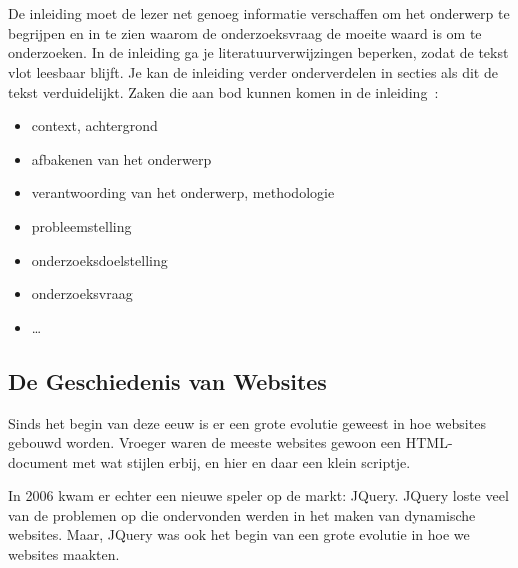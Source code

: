 
\chapter{}
\label{ch:inleiding}

De inleiding moet de lezer net genoeg informatie verschaffen om het onderwerp te begrijpen en in te zien waarom de onderzoeksvraag de moeite waard is om te onderzoeken. In de inleiding ga je literatuurverwijzingen beperken, zodat de tekst vlot leesbaar blijft. Je kan de inleiding verder onderverdelen in secties als dit de tekst verduidelijkt. Zaken die aan bod kunnen komen in de inleiding~\autocite{Pollefliet2011}:

\begin{itemize}
  \item context, achtergrond
  \item afbakenen van het onderwerp
  \item verantwoording van het onderwerp, methodologie
  \item probleemstelling
  \item onderzoeksdoelstelling
  \item onderzoeksvraag
  \item \ldots
\end{itemize}

\section{De Geschiedenis van Websites}

Sinds het begin van deze eeuw is er een grote evolutie geweest in hoe websites gebouwd worden. Vroeger waren de meeste websites gewoon een HTML-document met wat stijlen erbij, en hier en daar een klein scriptje. 

In 2006 kwam er echter een nieuwe speler op de markt: JQuery. JQuery loste veel van de problemen op die ondervonden werden in het maken van dynamische websites. Maar, JQuery was ook het begin van een grote evolutie in hoe we websites maakten.


